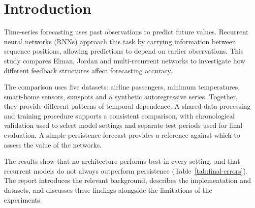 \section{Introduction}
\label{sec:introduction}

Time-series forecasting uses past observations to predict future values.
Recurrent neural networks (RNNs) approach this task by carrying information
between sequence positions, allowing predictions to depend on earlier
observations. This study compares Elman, Jordan and multi-recurrent networks to
investigate how different feedback structures affect forecasting accuracy.

The comparison uses five datasets: airline passengers, minimum temperatures,
smart-home sensors, sunspots and a synthetic autoregressive series. Together,
they provide different patterns of temporal dependence. A shared data-processing
and training procedure supports a consistent comparison, with chronological
validation used to select model settings and separate test periods used for
final evaluation. A simple persistence forecast provides a reference against
which to assess the value of the networks.

The results show that no architecture performs best in every setting, and that
recurrent models do not always outperform persistence
(Table~\ref{tab:final-errors}). The report introduces the relevant background,
describes the implementation and datasets, and discusses these findings
alongside the limitations of the experiments.
